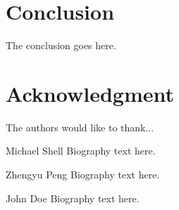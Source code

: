\documentclass[journal,twocolumn,letterpaper]{IEEEJERM}
\begin{document}

\section{Conclusion}
The conclusion goes here.

\section*{Acknowledgment}
The authors would like to thank...


% 

\begin{IEEEbiography}{Michael Shell}
Biography text here.
\end{IEEEbiography}

\begin{IEEEbiography}{Zhengyu Peng}
Biography text here.
\end{IEEEbiography}

\begin{IEEEbiographynophoto}{John Doe}
Biography text here.
\end{IEEEbiographynophoto}
\end{document}

